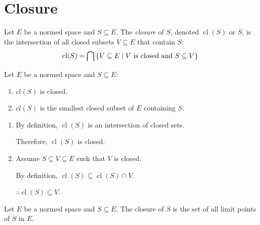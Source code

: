 \documentclass[letterpaper,12pt,fleqn]{article}
\newcommand{\bcl}[1]{\overline{#1}}
\DeclareMathOperator{\cl}{cl}
\begin{document}
\section*{Closure}

\begin{definition}[Closure]
  Let $E$ be a normed space and $S\subseteq E$. The \emph{closure} of $S$,
  denoted $\cl(S)$ or $\bcl{S}$, is the intersection of all closed subsets
  $V\subseteq E$ that contain $S$:
  \[\cl(S)=\bigcap\,\{V\subseteq E\mid V$ is closed and $S\subseteq V\}\]
\end{definition}

\begin{properties}
  Let $E$ be a normed space and $S\subseteq E$:
  \begin{enumerate}
  \item $cl(S)$ is closed.
  \item $cl(S)$ is the smallest closed subset of $E$ containing $S$.
  \end{enumerate}
\end{properties}

\begin{theproof}
  \listbreak
  \begin{enumerate}
  \item By definition, $\cl(S)$ is an intersection of closed sets.

    Therefore, $\cl(S)$ is closed.

  \item Assume $S\subseteq V\subseteq E$ such that $V$ is closed.

    By definition, $\cl(S)\subseteq\cl(S)\cap V$.

    $\therefore\cl(S)\subseteq V$.
  \end{enumerate}
\end{theproof}

\begin{theorem}
  Let $E$ be a normed space and $S\subseteq E$. The closure of $S$ is the set
  of all limit points of $S$ in $E$.
\end{theorem}
\end{document}
